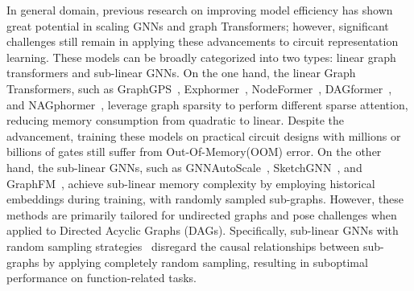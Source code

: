 

In general domain, previous research on improving model efficiency has shown great potential in scaling GNNs and graph Transformers; however, significant challenges still remain in applying these advancements to circuit representation learning.
These models can be broadly categorized into two types: linear graph transformers and sub-linear GNNs.
On the one hand, the linear Graph Transformers, such as GraphGPS~\citep{GraphGPS}, Exphormer~\citep{Exphormer}, NodeFormer~\citep{Nodeformer}, DAGformer~\citep{DAGformer}, and NAGphormer~\citep{NAGphormer}, leverage graph sparsity to perform different sparse attention, reducing memory consumption from quadratic to linear. Despite the advancement, training these models on practical circuit designs with millions or billions of gates still suffer from Out-Of-Memory(OOM) error.
On the other hand, the sub-linear GNNs, such as GNNAutoScale~\citep{GNNAutoScale}, SketchGNN~\citep{SketchGNN}, and GraphFM~\citep{GraphFM}, achieve sub-linear memory complexity by employing historical embeddings during training, with randomly sampled sub-graphs. However, these methods are primarily tailored for undirected graphs and pose challenges when applied to Directed Acyclic Graphs (DAGs). 
Specifically, sub-linear GNNs with random sampling strategies~\citep{GNNAutoScale, GraphFM, SketchGNN} disregard the causal relationships between sub-graphs by applying completely random sampling, resulting in suboptimal performance on function-related tasks.

